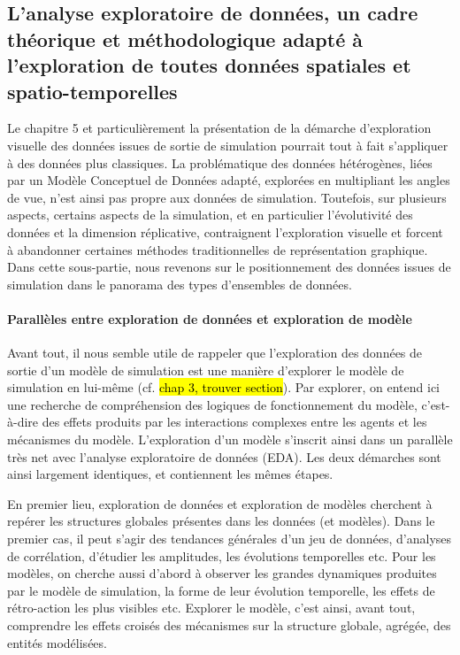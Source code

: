 \subsection{L'analyse exploratoire de données, un cadre théorique et méthodologique adapté à l'exploration de toutes données spatiales et spatio-temporelles \label{subsec:genericite-donnees-simul}}

Le chapitre 5 et particulièrement la présentation de la démarche d'exploration visuelle des données issues de sortie de simulation pourrait tout à fait s'appliquer à des données plus classiques.
La problématique des données hétérogènes, liées par un Modèle Conceptuel de Données adapté, explorées en multipliant les angles de vue, n'est ainsi pas propre aux données de simulation.
Toutefois, sur plusieurs aspects, certains aspects de la simulation, et en particulier l'évolutivité des données et la dimension réplicative, contraignent l'exploration visuelle et forcent à abandonner certaines méthodes traditionnelles de représentation graphique.
Dans cette sous-partie, nous revenons sur le positionnement des données issues de simulation dans le panorama des types d'ensembles de données.

\paragraph{Parallèles entre exploration de données et exploration de modèle}
Avant tout, il nous semble utile de rappeler que l'exploration des données de sortie d'un modèle de simulation est une manière d'explorer le modèle de simulation en lui-même (cf. \hl{chap 3, trouver section}).
Par explorer, on entend ici une recherche de compréhension des logiques de fonctionnement du modèle, c'est-à-dire des effets produits par les interactions complexes entre les agents et les mécanismes du modèle.
L'exploration d'un modèle s'inscrit ainsi dans un parallèle très net avec l'analyse exploratoire de données (EDA).
Les deux démarches sont ainsi largement identiques, et contiennent les mêmes étapes.

\noindent En premier lieu, exploration de données et exploration de modèles cherchent à repérer les structures globales présentes dans les données (et modèles).
Dans le premier cas, il peut s'agir des tendances générales d'un jeu de données, d'analyses de corrélation, d'étudier les amplitudes, les évolutions temporelles etc.
Pour les modèles, on cherche aussi d'abord à observer les grandes dynamiques produites par le modèle de simulation, la forme de leur évolution temporelle, les effets de rétro-action les plus visibles etc.
Explorer le modèle, c'est ainsi, avant tout, comprendre les effets croisés des mécanismes sur la structure globale, agrégée, des entités modélisées.

